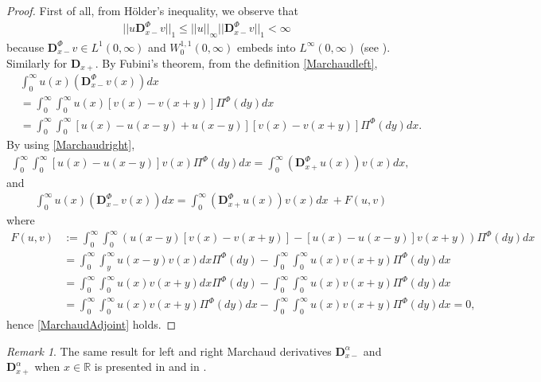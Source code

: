 \documentclass[11pt,a4paper]{article}
\theoremstyle{plain}
\theoremstyle{definition}
\theoremstyle{remark}
\newtheorem{remark}{Remark}
\begin{document}
		\begin{proof}
			First of all, from H\"{o}lder's inequality, we observe that
			\begin{align*}
				\vert \vert u \mathbf{D}_{x-}^\Phi v \vert \vert_1 \leq \vert \vert u \vert \vert_\infty \vert \vert \mathbf{D}_{x-}^\Phi v \vert \vert_1 < \infty
			\end{align*}
			because $\mathbf{D}_{x-}^\Phi v \in L^1(0,\infty)$ and $W_0^{1,1}(0,\infty)$ embeds into $L^\infty(0,\infty)$ (see \cite[section 11.2]{leoni2017first}). Similarly for $\mathbf{D}_{x+}$. By Fubini's theorem, from the definition \eqref{Marchaudleft},
			\begin{align*}
				&\int_{0}^\infty u(x) \left(\mathbf{D}_{x-}^\Phi v(x)\right) dx\\ &=\int_{0}^\infty \int_0^\infty u(x)[v(x) - v(x+y)] \Pi^\Phi(dy) dx\\
				&=\int_{0}^\infty \int_0^\infty [u(x)-u(x-y) + u(x-y)][v(x) - v(x+y)] \Pi^\Phi(dy) dx.
			\end{align*}
			By using \eqref{Marchaudright},
			\begin{align*}
				\int_{0}^\infty \int_0^\infty [u(x)-u(x-y)] v(x) \Pi^\Phi(dy) dx= \int_{0}^\infty \left(\mathbf{D}_{x+}^\Phi u(x)\right)v(x) dx,
			\end{align*}
			and
			\begin{align*}
				&\int_{0}^\infty u(x) \left(\mathbf{D}_{x-}^\Phi v(x)\right) dx=\int_{0}^\infty \left(\mathbf{D}_{x+}^\Phi u(x)\right)v(x) dx \ + F(u,v)
			\end{align*}
			where
			\begin{align*}
				F(u,v)&:= \int_{0}^\infty \int_0^\infty \left( u(x-y)[v(x) - v(x+y)] - [u(x)-u(x-y)] v(x+y) \right )\Pi^\Phi(dy) dx\\
				&=\int_{0}^\infty \int_y^\infty u(x-y) v(x) dx \Pi^\Phi(dy)  - \int_{0}^\infty \int_0^\infty u(x) v(x+y) \Pi^\Phi(dy) dx\\
				&=\int_{0}^\infty \int_{0}^\infty u(x) v(x+y)  dx \Pi^\Phi(dy)- \int_{0}^\infty \int_0^\infty u(x) v(x+y) \Pi^\Phi(dy) dx\\
				&= \int_{0}^\infty \int_0^\infty u(x) v(x+y) \Pi^\Phi(dy) dx- \int_{0}^\infty \int_0^\infty u(x) v(x+y) \Pi^\Phi(dy) dx=0,
			\end{align*}
			hence \eqref{MarchaudAdjoint} holds.
		\end{proof}
		\begin{remark}
			The same result for left and right Marchaud derivatives $\mathbf{D}_{x-}^\alpha$ and $\mathbf{D}_{x+}^\alpha$ when $x \in \mathbb{R}$ is presented in \cite[(6.27)]{samko1993fractional} and in \cite[Exercise 1.8.2]{kolokoltsov2011markov}.
		\end{remark}
\end{document}
